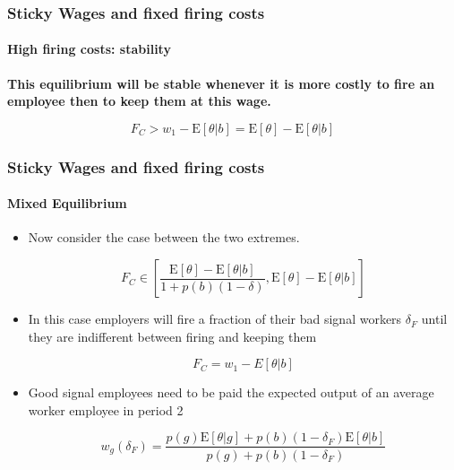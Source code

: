 \documentclass{beamer}
\newcommand{\E}{\mathrm{E}}
\begin{document}


\begin{frame}
\frametitle{Sticky Wages and fixed firing costs}

\framesubtitle{High firing costs: stability}


\begin{large}
	\textbf{This equilibrium will be stable whenever it is more costly to fire an employee then to keep them at this wage.}
\end{large}


$$ F_C >  w_1 - \E[\theta|b] = \E[\theta] - \E[\theta|b]$$



\end{frame}



\begin{frame}

\frametitle{Sticky Wages and fixed firing costs}

\framesubtitle{Mixed Equilibrium}

\begin{itemize}
	\setlength{\itemsep}{3mm}
	\item Now consider the case between the two extremes.
	
	$$ F_C \in \left[  \frac{\E[\theta] - \E[\theta|b]}{1 + p(b)(1-\delta)} , \E[\theta] - \E[\theta|b] \right] $$
	
	\item In this case employers will fire a fraction of their bad signal workers $\delta_F$ until they are indifferent between firing and keeping them 
	
	$$  F_C = w_1 - E[\theta|b]$$ 
	
	\item Good signal employees need to be paid the expected output of an average worker employee in period 2 
	
	$$ w_g(\delta_F) = \frac{p(g)\E[\theta|g] + p(b)(1-\delta_F) \E[\theta|b] }{p(g) + p(b)(1-\delta_F)} $$
	

\end{itemize}
\end{frame}

\end{document}
